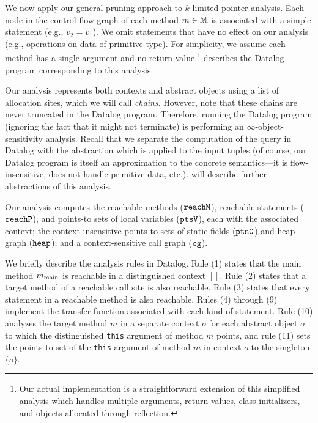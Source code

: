 
We now apply our general pruning approach to $k$-limited pointer analysis.
Each node in the control-flow graph of each method $m \in {\mathbb M}$ is associated with a
simple statement (e.g., $v_2 = v_1$).
We omit statements that have no effect on our analysis (e.g., operations on
data of primitive type).
For simplicity, we assume each method has a single argument and no return value.\footnote{
Our actual implementation is a straightforward extension of this simplified analysis
which handles multiple arguments, return values, class initializers, and
objects allocated through reflection.}
 describes the Datalog program corresponding to this
analysis.

Our analysis represents both contexts and abstract objects using a list of
allocation sites, which we will call {\em chains}.  However, note that these
chains are never truncated in the Datalog program.  Therefore, running the
Datalog program (ignoring the fact that it might not terminate) is performing
an $\infty$-object-sensitivity analysis.  Recall that we separate the
computation of the query in Datalog with the abstraction which is applied to
the input tuples (of course, our Datalog program is itself an approximation to
the concrete semantics---it is flow-insensitive, does not handle primitive
data, etc.).   will describe further abstractions of this
analysis.

Our analysis computes the reachable methods ($\text{\tt reachM}$), reachable statements ($\text{\tt reachP}$), and
points-to sets of local variables ($\text{\tt ptsV}$), each with the associated context;
the context-insensitive points-to sets of static fields ($\text{\tt ptsG}$) and
heap graph ($\text{\tt heap}$); and a context-sensitive call graph ($\text{\tt cg}$).

We briefly describe the analysis rules in Datalog.  Rule (1)
states that the main method $m_\text{main}$ is reachable in a distinguished context $[]$.
Rule (2) states that a target method of a reachable call site is also reachable.
Rule (3) states that every statement in a reachable method is also reachable.
Rules (4) through (9) implement the transfer function associated with each kind of
statement.
Rule (10) analyzes the target method
$m$ in a separate context $o$ for each abstract object $o$ to which the distinguished
{\tt this} argument of method $m$ points, and rule (11) sets the points-to set
of the {\tt this} argument of method $m$ in context $o$ to the singleton $\{ o \}$.

